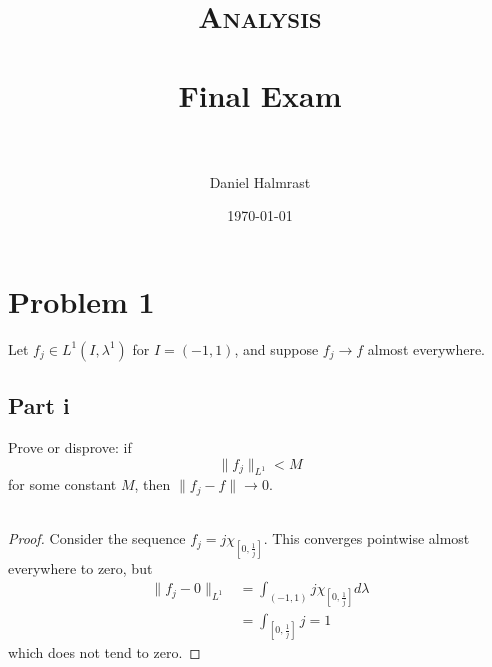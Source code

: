 \documentclass[fontsize=11pt]{scrartcl} %
\title{	
\normalfont \normalsize 
\textsc{Analysis} \\ [25pt] %
\horrule{0.5pt} \\[0.4cm] %
\huge Final Exam \\ %
\horrule{2pt} \\[0.5cm] %
}
\author{Daniel Halmrast} %
\date{\normalsize\today} %
\numberwithin{equation}{section} %
\numberwithin{figure}{section} %
\numberwithin{table}{section} %
\begin{document}
\maketitle %

\section*{Problem 1}
Let $f_j\in L^1(I,\lambda^1)$ for $I=(-1,1)$, and suppose $f_j\to f$ almost
everywhere.

\subsection*{Part i}
Prove or disprove: if
\[
    \|f_j\|_{L^1} < M
\]
for some constant $M$, then $\|f_j-f\|\to 0$.
\\
\\
\begin{proof}
    Consider the sequence $f_j = j\chi_{[0,\frac{1}{j}]}$. This converges
    pointwise almost everywhere to zero, but
    \[
        \begin{aligned}
        \|f_j-0\|_{L^1} &= \int_{(-1,1)}j\chi_{[0,\frac{1}{j}]}d\lambda\\
        &=\int_{[0,\frac{1}{j}]}j = 1
    \end{aligned}
    \]
    which does not tend to zero.
\end{proof}
\end{document}
